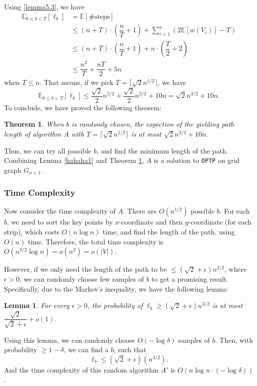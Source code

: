 \documentclass[11pt]{article}
\theoremstyle{plain}
\newtheorem{lemma}{Lemma}[section]
\newtheorem{theorem}{Theorem}[section]
\begin{document}
Using \ref{lemma5.3}, we have
\begin{align*}
\mathbb{E}_{0\le b<T}[\ell_b] &= \mathbb{E}[\#\text{steps}]\\
&\le (n+T)\cdot \left(\dfrac{n}{T}+1\right)+\sum\limits_{i=1}^n (2\mathbb{E}[w(V_i)]-T)\\
&\le (n+T)\cdot \left(\dfrac{n}{T}+1\right) + n\cdot \left(\dfrac{T}{2}+2\right)\\
&\le \dfrac{n^2}{T}+\dfrac{nT}{2}+5n
\end{align*}
when $T\le n$. That means, if we pick $T=\lceil\sqrt{2}n^{1/2}\rceil$, we have
$$\mathbb{E}_{0\le b<T}[\ell_b]\le \dfrac{\sqrt{2}}{2}n^{3/2}+\dfrac{\sqrt{2}}{2}n^{3/2}+10n = \sqrt{2}n^{3/2}+10n.$$
To conclude, we have proved the following theorem:
\begin{theorem}
    \label{theo5.1}
When $b$ is randomly chosen, the expection of the yielding path length of algorithm $A$ with $T=\lceil\sqrt{2}n^{1/2}\rceil$ is at most $\sqrt{2}n^{3/2}+10n$.
\end{theorem}

Thus, we can try all possible $b$, and find the minimum length of the path. Combining Lemma \ref{hahaha1} and Theorem \ref{theo5.1}, $A$ is a solution to \texttt{OPTP} on grid graph $G_{n+1}$.

\subsubsection{Time Complexity}

Now consider the time complexity of $A$. There are $O(n^{1/2})$ possible $b$. For each $b$, we need to sort the key points by $x$-coordinate and then $y$-coordinate (for each strip), which costs $O(n\log n)$ time; and find the length of the path, using $O(n)$ time. Therefore, the total time complexity is $O(n^{3/2}\log n)=o(n^2)=o(|V|)$.

However, if we only need the length of the path to be $\le (\sqrt{2}+\epsilon)n^{3/2}$, where $\epsilon>0$, we can randomly choose few samples of $b$ to get a promising result. Specifically, due to the Markov's inequality, we have the following lemma:
\begin{lemma}
    \label{lemma5.4}
For every $\epsilon>0$, the probability of $\ell_b\ge (\sqrt{2}+\epsilon)n^{3/2}$ is at most $\dfrac{\sqrt{2}}{\sqrt{2}+\epsilon}+o(1)$.
\end{lemma}
Using this lemma, we can randomly choose $O(-\log \delta)$ samples of $b$. Then, with probability $\ge 1-\delta$, we can find a $b$, such that
$$\ell_b\le (\sqrt{2}+\epsilon)(n^{3/2}).$$
And the time complexity of this random algorithm $A'$ is $O(n\log n\cdot (-\log \delta))$.
\end{document}
